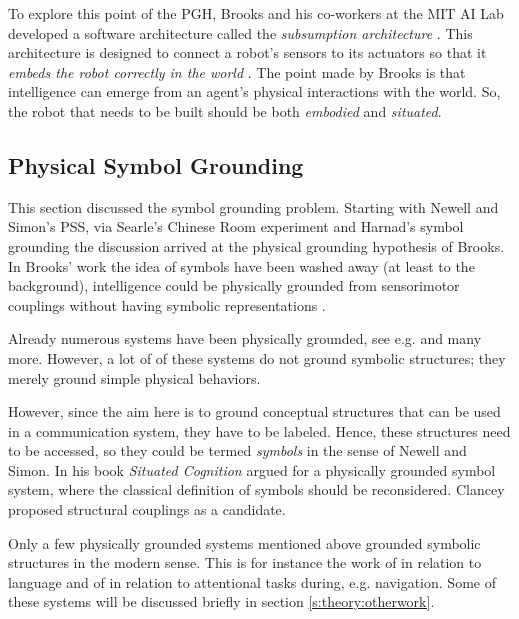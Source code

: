
To explore this point of the PGH, Brooks and his co-workers at the MIT AI Lab developed a software architecture called the {\em subsumption architecture} \cite{brooks:1986}. This architecture is designed to connect a robot's sensors to its actuators so that it {\em embeds the robot correctly in the world} \cite{brooks:1990}.  The point made by Brooks is that intelligence can emerge from an agent's physical interactions with the world. So, the robot that needs to be built should be both {\em embodied} and {\em situated}. 



\subsection{Physical Symbol Grounding}

This section discussed the symbol grounding problem. Starting with Newell and Simon's PSS, via Searle's Chinese Room experiment and Harnad's symbol grounding the discussion arrived at the physical grounding hypothesis of Brooks. In Brooks' work the idea of symbols have been washed away (at least to the background), intelligence could be physically grounded from sensorimotor couplings without having symbolic representations \cite{brooks:1991}.

Already numerous systems have been physically grounded, see e.g. \cite{brooks:1990,steels:1994,barnesetal:1997,KroBunVlaMot99,taninolfi:1998,berthouzekuniyoshi:1998,pfeiferscheier:1999,billard:1997a,rosenstein:1998a,yancostein} and many more. However, a lot of of these systems do not ground symbolic structures; they merely ground simple physical behaviors. 

However, since the aim here is to ground conceptual structures that can be used in a communication system, they have to be labeled. Hence, these structures need to be accessed, so they could be termed {\em symbols} in the sense of Newell and Simon. In his book {\em Situated Cognition} \cite{clancey:1997} argued for a physically grounded symbol system, where the classical definition of symbols should be reconsidered. Clancey proposed structural couplings as a candidate.

Only a few physically grounded systems mentioned above grounded symbolic structures in the modern sense. This is for instance the work of \cite{billard:1997a,rosenstein:1998a,yancostein} in relation to language and of \cite{taninolfi:1998,berthouzekuniyoshi:1998} in relation to attentional tasks during, e.g. navigation. Some of these systems will be discussed briefly in section \ref{s:theory:otherwork}. 

